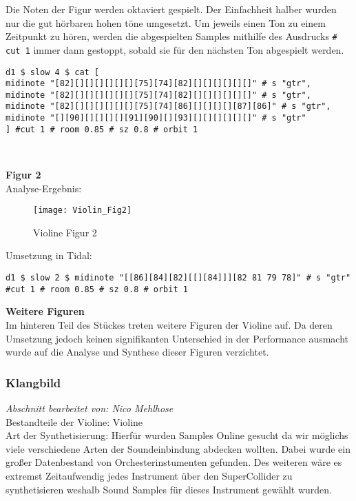 \documentclass[
10pt, %
a4paper, %
oneside, %
headinclude,footinclude, %
BCOR5mm, %
]{scrartcl}
\begin{document}
\noindent Die Noten der Figur werden oktaviert gespielt. Der Einfachheit halber wurden nur die gut hörbaren hohen töne umgesetzt. Um jeweils einen Ton zu einem Zeitpunkt zu hören, werden die abgespielten Samples mithilfe des Ausdrucks \verb|# cut 1| immer dann gestoppt, sobald sie für den nächsten Ton abgespielt werden.\cite{tid12}

\begin{lstlisting}
d1 $ slow 4 $ cat [
midinote "[82][][][][][][][75][74][82][][][][][][]" # s "gtr",
midinote "[82][][][][][][][75][74][82][][][][][][]" # s "gtr",
midinote "[82][][][][][][][75][74][86][][][][][87][86]" # s "gtr",
midinote "[][90][][][][][91][90][][93][][][][][][]" # s "gtr"
] #cut 1 # room 0.85 # sz 0.8 # orbit 1 
\end{lstlisting}\

\noindent\textbf{Figur 2}\\
Analyse-Ergebnis:
\begin{figure}[h]
	\centering 
	\texttt{[image: Violin\_Fig2]} 
	\caption{Violine Figur 2}
\end{figure}

\noindent Umsetzung in Tidal:
\begin{lstlisting}
d1 $ slow 2 $ midinote "[[86][84][82][[][84]]][82 81 79 78]" # s "gtr" #cut 1 # room 0.85 # sz 0.8 # orbit 1
\end{lstlisting}

\noindent\textbf{Weitere Figuren}\\
Im hinteren Teil des Stückes treten weitere Figuren der Violine auf. Da deren Umsetzung jedoch keinen signifikanten Unterschied in der Performance ausmacht wurde auf die Analyse und Synthese dieser Figuren verzichtet.

\subsubsection{Klangbild}
\textit{Abschnitt bearbeitet von: Nico Mehlhose}\\

\noindent 
Bestandteile der Violine: Violine\\
Art der Synthetisierung: Hierfür wurden Samples Online gesucht da wir möglichs viele verschiedene Arten der Soundeinbindung abdecken wollten. Dabei wurde ein großer Datenbestand von Orchesterinstumenten gefunden.\cite{Orch} Des weiteren wäre es extremst Zeitaufwendig jedes Instrument über den SuperCollider zu synthetisieren weshalb Sound Samples für dieses Instrument gewählt wurden.\\
\end{document}
